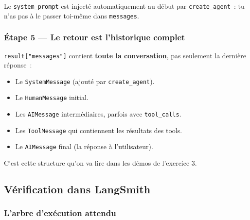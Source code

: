 \documentclass[11pt,a4paper]{article}
\begin{document}
Le \texttt{system\_prompt} est injecté automatiquement au début par
\texttt{create\_agent}~: tu n'as pas à le passer toi-même dans
\texttt{messages}.

\subsubsection*{Étape 5 — Le retour est l'historique complet}

\texttt{result["messages"]} contient \textbf{toute la conversation},
pas seulement la dernière réponse~:

\begin{itemize}[leftmargin=*]
  \item Le \texttt{SystemMessage} (ajouté par \texttt{create\_agent}).
  \item Le \texttt{HumanMessage} initial.
  \item Les \texttt{AIMessage} intermédiaires, parfois avec
        \texttt{tool\_calls}.
  \item Les \texttt{ToolMessage} qui contiennent les résultats des tools.
  \item Le \texttt{AIMessage} final (la réponse à l'utilisateur).
\end{itemize}

C'est cette structure qu'on va lire dans les démos de l'exercice 3.

\subsection{Vérification dans LangSmith}

\subsubsection*{L'arbre d'exécution attendu}

\begin{center}
\end{center}
\end{document}

